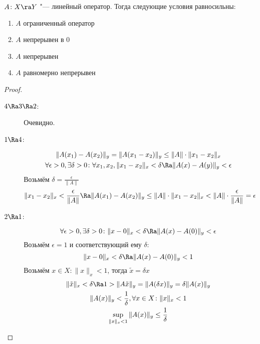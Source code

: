 \begin{theorem}
	$A \colon X \ra Y$ "--- линейный оператор.
	Тогда следующие условия равносильны:
	\begin{enumerate}
		\item $A$ ограниченный оператор
		\item $A$ непрерывен в 0
		\item $A$ непрерывен
		\item $A$ равномерно непрерывен
	\end{enumerate}
\end{theorem}
\begin{proof}
	\begin{description}
	\item[$4\Ra 3 \Ra 2$:]
		Очевидно.

	\item[$1 \Ra 4$:]
		\begin{gather*}
			\|A(x_1) - A(x_2)\|_y = \|A(x_1 - x_2)\|_y \le \|A\| \cdot \|x_1 - x_2\|_x \\
			\forall \epsilon > 0, \exists \delta > 0 \colon \forall x_1, x_2, \|x_1 - x_2\|_x < \delta \Ra \|A(x) - A(y)\|_y < \epsilon
		\end{gather*}
		Возьмём $\delta = \frac{\epsilon}{\|A\|}$
		\[
			\|x_1 - x_2\|_x < \frac{\epsilon}{\|A\|} \Ra \|A(x_1) - A(x_2)\|_y \le \|A\| \cdot \|x_1 - x_2\|_x
				< \|A\| \cdot \frac{\epsilon}{\|A\|} = \epsilon
		\]

	\item[$2 \Ra 1$:]
		\[ \forall \epsilon > 0, \exists \delta > 0 \colon \|x - 0\|_x < \delta \Ra \|A(x) - A(0)\|_y < \epsilon \]
		Возьмём $\epsilon = 1$ и соответствующий ему $\delta$:
		\[ \|x - 0\|_x < \delta \Ra \|A(x) - A(0)\|_y < 1 \]
		Возьмём $x\in X \colon \|x\|_x < 1$, тогда $\tilde x = \delta x$
		\begin{gather*}
			\|\tilde x\|_x < \delta \Ra 1 > \|A \tilde x\|_y = \|A(\delta x)\|_y = \delta \|A(x)\|_y \\
			\|A(x)\|_y < \frac{1}{\delta}, \forall x \in X \colon \|x\|_x < 1 \\
			\sup_{\|x\|_x < 1} \|A(x)\|_y \le \frac{1}{\delta}
		\end{gather*}
	\end{description}
\end{proof}

